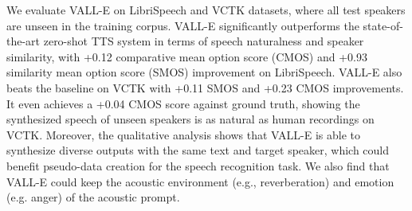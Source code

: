 \documentclass{article}
\theoremstyle{plain}
\theoremstyle{definition}
\theoremstyle{remark}
\newcommand\our{\textsc{VALL-E}}
\begin{document}
 
We evaluate \our{} on LibriSpeech \citep{panayotov2015librispeech} and VCTK \citep{veaux2016superseded} datasets, where all test speakers are unseen in the training corpus. \our{} significantly outperforms the state-of-the-art zero-shot TTS system 
 \citep{casanova2022yourtts} in terms of speech naturalness and speaker similarity, with +0.12 comparative mean option score (CMOS) and +0.93 similarity mean option score (SMOS) improvement on LibriSpeech. 
\our{} also beats the baseline on VCTK with +0.11 SMOS and +0.23 CMOS improvements. It even achieves a +0.04 CMOS score against ground truth, showing the synthesized speech of unseen speakers is as natural as human recordings on VCTK. Moreover, the qualitative analysis shows that \our{} is able to synthesize diverse outputs with the same text and target speaker, which could benefit pseudo-data creation for the speech recognition task. We also find that \our{} could keep the acoustic environment (e.g.,  reverberation) and emotion (e.g. anger) of the acoustic prompt. 
\end{document}
